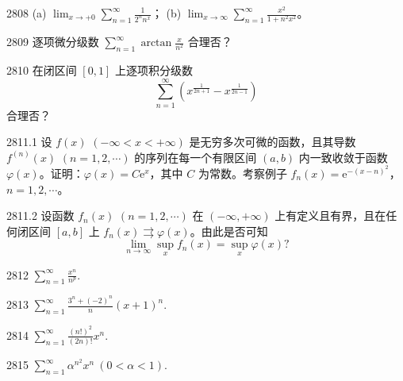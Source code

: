 \begin{prob}[M]{2808}
(a) $\displaystyle\lim_{x\to +0} \sum_{n=1}^{\infty} \frac{1}{2^n n^x}$； \qquad (b) $\displaystyle\lim_{x\to \infty} \sum_{n=1}^{\infty} \frac{x^2}{1 + n^2 x^2}$。
\end{prob}

\begin{prob}[S]{2809}
逐项微分级数 $\displaystyle\sum_{n=1}^{\infty} \arctan\frac{x}{n^2}$ 合理否？
\end{prob}

\begin{prob}[M]{2810}
在闭区间 $[0,1]$ 上逐项积分级数
\[
\sum_{n=1}^{\infty} \left( x^{\frac{1}{2n+1}} - x^{\frac{1}{2n-1}} \right)
\]
合理否？
\end{prob}

\begin{prob}[M]{2811.1}
设 $f(x)$ $(-\infty < x < +\infty)$ 是无穷多次可微的函数，且其导数 $f^{(n)}(x)$ $(n=1,2,\cdots)$ 的序列在每一个有限区间 $(a,b)$ 内一致收敛于函数 $\varphi(x)$。证明：$\varphi(x) = C\mathrm{e}^x$，其中 $C$ 为常数。考察例子 $f_n(x) = \mathrm{e}^{-(x-n)^2}$，$n=1,2,\cdots$。
\end{prob}

\begin{prob}[M]{2811.2}
设函数 $f_n(x)$ $(n=1,2,\cdots)$ 在 $(-\infty, +\infty)$ 上有定义且有界，且在任何闭区间 $[a,b]$ 上 $f_n(x) \rightrightarrows \varphi(x)$。由此是否可知
\[
\lim_{n\to\infty} \sup_x f_n(x) = \sup_x \varphi(x) ?
\]
\end{prob}



\begin{prob}[S]{2812}
$\displaystyle\sum_{n=1}^{\infty} \frac{x^n}{n^p}$.
\end{prob}

\begin{prob}[S]{2813}
$\displaystyle\sum_{n=1}^{\infty} \frac{3^n + (-2)^n}{n}(x+1)^n$.
\end{prob}

\begin{prob}[S]{2814}
$\displaystyle\sum_{n=1}^{\infty} \frac{(n!)^2}{(2n)!}x^n$.
\end{prob}

\begin{prob}[S]{2815}
$\displaystyle\sum_{n=1}^{\infty} \alpha^{n^2}x^n \ (0 < \alpha < 1)$.
\end{prob}

